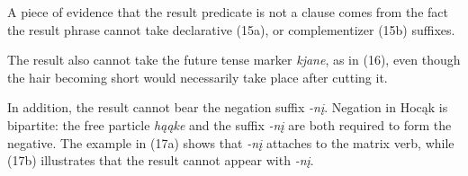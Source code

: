 \documentclass[output=paper]{LSP/langsci}
\begin{document}
A piece of evidence that the result predicate is not a clause comes from the fact the result phrase cannot take declarative (15a), or complementizer (15b) suffixes.

\begin{exe}
\ex
\begin{xlist}



\end{xlist}
\end{exe}

The result also cannot take the future tense marker \textit{kjane}, as in (16), even though the hair becoming short would necessarily take place after cutting it.

\begin{exe}


\end{exe}

In addition, the result cannot bear the negation suffix \textit{-n\k{i}}. Negation in Hoc\k{a}k is bipartite: the free particle \textit{h\k{a}\k{a}ke} and the suffix \textit{-n\k{i}} are both required to form the negative. The example in (17a) shows that \textit{-n\k{i}} attaches to the matrix verb, while (17b) illustrates that the result cannot appear with \textit{-n\k{i}}.
\end{document}
